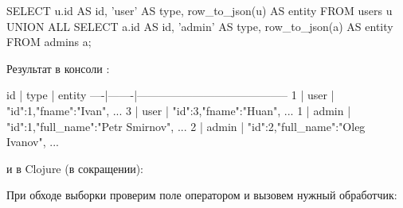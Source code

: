 \begin{english}
  \begin{sql}
SELECT
  u.id AS id,
  'user' AS type,
  row_to_json(u) AS entity
FROM
  users u
UNION ALL
SELECT
  a.id AS id,
  'admin' AS type,
  row_to_json(a) AS entity
FROM
  admins a;
  \end{sql}
\end{english}

Результат в консоли :



\begin{english}
  \begin{text}
 id | type  |                 entity
----|-------|-----------------------------------------
  1 | user  | {"id":1,"fname":"Ivan", ...}
  3 | user  | {"id":3,"fname":"Huan", ...}
  1 | admin | {"id":1,"full_name":"Petr Smirnov", ...}
  2 | admin | {"id":2,"full_name":"Oleg Ivanov", ...}
  \end{text}
\end{english}

\noindent
и в Clojure (в сокращении):

\begin{english}
  \begin{clojure}
  \end{clojure}
\end{english}

При обходе выборки проверим поле  оператором  и вызовем нужный обработчик:

